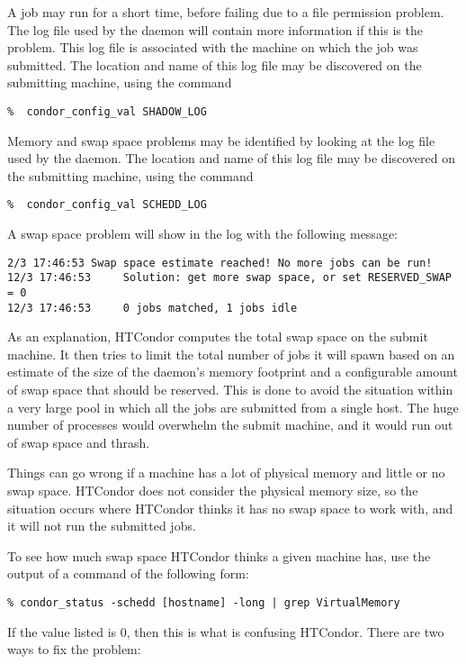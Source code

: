 A job may run for a short time, before failing due to a file permission
problem.
The log file used by the  daemon will contain more information
if this is the problem.
This log file is associated with the machine on which the job was submitted.
The location and name of this log file may be discovered on the
submitting machine, using the command
\footnotesize
\begin{verbatim}
%  condor_config_val SHADOW_LOG
\end{verbatim}
\normalsize

Memory and swap space problems may be identified by looking at the log
file used by the  daemon.
The location and name of this log file may be discovered on the
submitting machine, using the command
\footnotesize
\begin{verbatim}
%  condor_config_val SCHEDD_LOG
\end{verbatim}
\normalsize
A swap space problem will show in the log with the following message:
\footnotesize
\begin{verbatim}
2/3 17:46:53 Swap space estimate reached! No more jobs can be run!
12/3 17:46:53     Solution: get more swap space, or set RESERVED_SWAP = 0
12/3 17:46:53     0 jobs matched, 1 jobs idle
\end{verbatim}
\normalsize
As an explanation,
HTCondor computes the total swap space on the submit machine.
It then tries to limit the total number of jobs it
will spawn based on an estimate of the size of the 
daemon's memory footprint and a configurable amount of swap space
that should be reserved.
This is done to avoid the
situation within a very large pool
in which all the jobs are submitted from a single host.
The huge number of  processes would
overwhelm the submit machine,
and it would run out of swap space and thrash.

Things can go wrong if a machine has a lot of physical memory and
little or no swap space.
HTCondor does not consider the physical memory size,
so the situation occurs where HTCondor thinks
it has no swap space to work with,
and it will not run the submitted jobs.

To see how much swap space HTCondor thinks a given machine has, use
the output of a  command of the following form:

\footnotesize
\begin{verbatim}
% condor_status -schedd [hostname] -long | grep VirtualMemory
\end{verbatim}
\normalsize
If the value listed is 0, then this is what is confusing HTCondor.
There are two ways to fix the problem:


